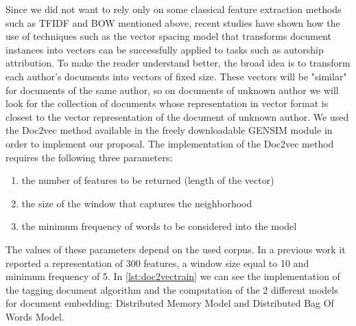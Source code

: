 Since we did not want to rely only on some classical feature extraction methods such as TFIDF and BOW mentioned above, recent studies have shown how the use of techniques such as the vector spacing model that transforms document instances into vectors can be successfully applied to tasks such as autorship attribution. To make the reader understand better, the broad idea is to transform each author's documents into vectors of fixed size. These vectors will be "similar" for documents of the same author, so on documents of unknown author we will look for the collection of documents whose representation in vector format is closest to the vector representation of the document of unknown author.
We used the Doc2vec \cite{le2014distributed} method available in the freely downloadable GENSIM module in order to implement our proposal. The implementation of the Doc2vec method requires the following three parameters:
\begin{enumerate}
	\item the number of features to be returned (length of the vector)
	\item the size of the window that captures the neighborhood
	\item the minimum frequency of words to be considered into the model
\end{enumerate}

The values of these parameters depend on the used corpus. In a previous work \cite{posadas2017application} it reported a representation of 300 features, a window size equal to 10
and minimum frequency of 5. In \autoref{lst:doc2vectrain} we can see the implementation of the tagging document algorithm and the computation of the 2 different models for document embedding: Distributed Memory Model and Distributed Bag Of Words Model.


